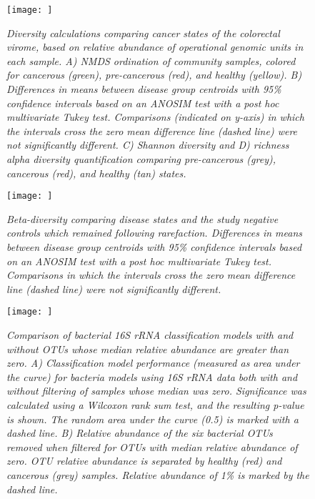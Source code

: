 \documentclass[12pt,]{article}
\begin{document}
\newpage

\begin{figure}[htbp]
\centering
\texttt{[image: ]}
\caption{\emph{Diversity calculations comparing cancer states of the
colorectal virome, based on relative abundance of operational genomic
units in each sample. A) NMDS ordination of community samples, colored
for cancerous (green), pre-cancerous (red), and healthy (yellow). B)
Differences in means between disease group centroids with 95\%
confidence intervals based on an ANOSIM test with a post hoc
multivariate Tukey test. Comparisons (indicated on y-axis) in which the
intervals cross the zero mean difference line (dashed line) were not
significantly different. C) Shannon diversity and D) richness alpha
diversity quantification comparing pre-cancerous (grey), cancerous
(red), and healthy (tan) states.}\label{betaogu}}
\end{figure}

\newpage

\begin{figure}[htbp]
\centering
\texttt{[image: ]}
\caption{\emph{Beta-diversity comparing disease states and the study
negative controls which remained following rarefaction. Differences in
means between disease group centroids with 95\% confidence intervals
based on an ANOSIM test with a post hoc multivariate Tukey test.
Comparisons in which the intervals cross the zero mean difference line
(dashed line) were not significantly different.}\label{betaogunegative}}
\end{figure}

\newpage

\begin{figure}[htbp]
\centering
\texttt{[image: ]}
\caption{\emph{Comparison of bacterial 16S rRNA classification models
with and without OTUs whose median relative abundance are greater than
zero. A) Classification model performance (measured as area under the
curve) for bacteria models using 16S rRNA data both with and without
filtering of samples whose median was zero. Significance was calculated
using a Wilcoxon rank sum test, and the resulting p-value is shown. The
random area under the curve (0.5) is marked with a dashed line. B)
Relative abundance of the six bacterial OTUs removed when filtered for
OTUs with median relative abundance of zero. OTU relative abundance is
separated by healthy (red) and cancerous (grey) samples. Relative
abundance of 1\% is marked by the dashed line.}\label{16scompare}}
\end{figure}
\end{document}
